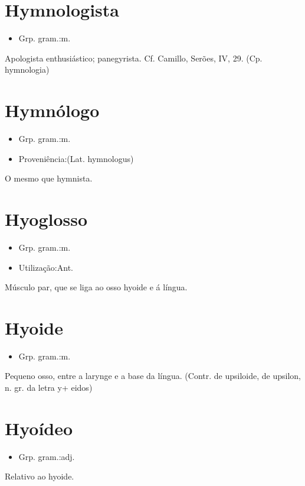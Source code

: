\documentclass{article}
\begin{document}
\section{Hymnologista}
\begin{itemize}
\item {Grp. gram.:m.}
\end{itemize}
Apologista enthusiástico; panegyrista. Cf. Camillo, \textunderscore Serões\textunderscore , IV, 29.
(Cp. \textunderscore hymnologia\textunderscore )
\section{Hymnólogo}
\begin{itemize}
\item {Grp. gram.:m.}
\end{itemize}
\begin{itemize}
\item {Proveniência:(Lat. \textunderscore hymnologus\textunderscore )}
\end{itemize}
O mesmo que \textunderscore hymnista\textunderscore .
\section{Hyoglosso}
\begin{itemize}
\item {Grp. gram.:m.}
\end{itemize}
\begin{itemize}
\item {Utilização:Ant.}
\end{itemize}
Músculo par, que se liga ao osso hyoide e á língua.
\section{Hyoide}
\begin{itemize}
\item {Grp. gram.:m.}
\end{itemize}
Pequeno osso, entre a larynge e a base da língua.
(Contr. de \textunderscore upsiloide\textunderscore , de \textunderscore upsilon\textunderscore , n. gr. da letra \textunderscore y\textunderscore  + \textunderscore eidos\textunderscore )
\section{Hyoídeo}
\begin{itemize}
\item {Grp. gram.:adj.}
\end{itemize}
Relativo ao hyoide.
\end{document}
